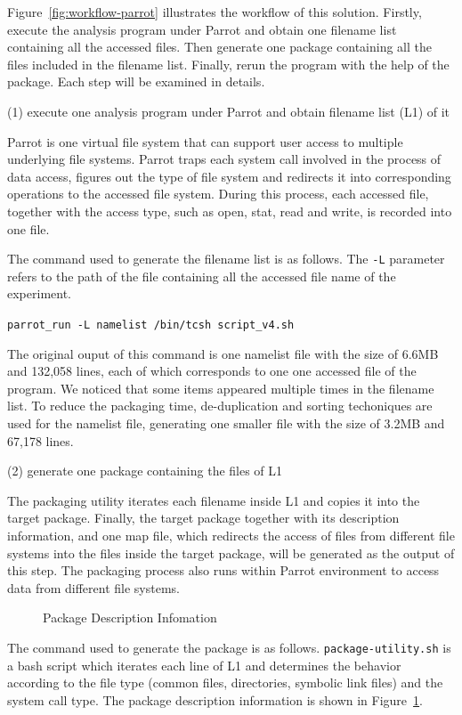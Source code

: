 \documentclass{acm_proc_article-sp}
\begin{document}
Figure~\ref{fig:workflow-parrot} illustrates the workflow of this solution. Firstly, execute the analysis program under Parrot and obtain one filename list containing all the accessed files. Then generate one package containing all the files included in the filename list. Finally, rerun the program with the help of the package. Each step will be examined in details.

(1) execute one analysis program under Parrot and obtain filename list (L1) of it

Parrot is one virtual file system that can support user access to multiple
underlying file systems. Parrot traps each system call involved in the process
of data access, figures out the type of file system and redirects it into
corresponding operations to the accessed file system. During this process, each
accessed file, together with the access type, such as
open, stat, read and write, is recorded into one file.

The command used to generate the filename list is as follows. The {\tt -L} parameter refers to the path of the file containing all the accessed file name of the experiment.

{\tt parrot\_run -L namelist /bin/tcsh script\_v4.sh}

The original ouput of this command is one namelist file with the size of 6.6MB
and 132,058 lines, each of which corresponds to one one accessed file of the
program. We noticed that some items appeared multiple times in the filename list. To reduce the
packaging time, de-duplication and sorting techoniques are used for the
namelist file, generating one smaller file with the size of 3.2MB and 67,178 lines.

(2) generate one package containing the files of L1 

The packaging utility iterates each filename inside L1 and copies it into the
target package. Finally, the target package
together with its description information, and one map file, which redirects
the access of files from different file systems into the files inside the target package, will be
generated as the output of this step. The packaging process also runs within Parrot environment to
access data from different file systems.

\begin{figure}
\centering
{}
\caption{Package Description Infomation}
\label{fig:package-info}
\end{figure}
The command used to generate the package is as follows. 
{\tt package-utility.sh} is a bash script which iterates each line of L1 and
determines the behavior according to the file type (common files, directories,
symbolic link files) and the system call type.
The package description information is shown in Figure~\ref{fig:package-info}.
\end{document}
